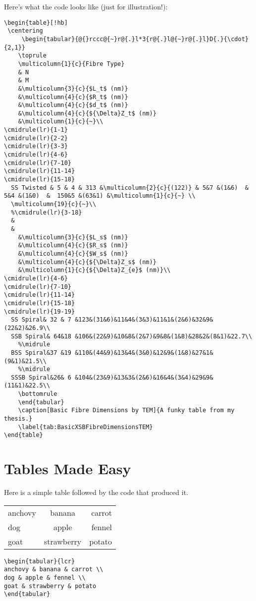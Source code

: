 \pagebreak
Here's what the code looks like (just for illustration!):
\begin{verbatim}
\begin{table}[!hb]
 \centering
	 \begin{tabular}{@{}rccc@{~}r@{.}l*3{r@{.}l@{~}r@{.}l}D{.}{\cdot}{2,1}}
	\toprule
	\multicolumn{1}{c}{Fibre Type}
	& N
	& M
	&\multicolumn{3}{c}{$L_t$ (nm)}
	&\multicolumn{4}{c}{$R_t$ (nm)}
	&\multicolumn{4}{c}{$d_t$ (nm)}
	&\multicolumn{4}{c}{${\Delta}Z_t$ (nm)}
	&\multicolumn{1}{c}{~}\\
\cmidrule(lr){1-1}
\cmidrule(lr){2-2}
\cmidrule(lr){3-3}
\cmidrule(lr){4-6}
\cmidrule(lr){7-10}
\cmidrule(lr){11-14}
\cmidrule(lr){15-18}
  SS Twisted & 5 & 4 & 313 &\multicolumn{2}{c}{(122)} & 5&7 &(1&6)  & 5&4 &(1&0)  &  150&5 &(63&1) &\multicolumn{1}{c}{~} \\
  \multicolumn{19}{c}{~}\\
  %\cmidrule(lr){3-18}
  &
  &
 	&\multicolumn{3}{c}{$L_s$ (nm)}
 	&\multicolumn{4}{c}{$R_s$ (nm)}
 	&\multicolumn{4}{c}{$W_s$ (nm)}
 	&\multicolumn{4}{c}{${\Delta}Z_s$ (nm)}
 	&\multicolumn{1}{c}{${\Delta}Z_{e}$ (nm)}\\
\cmidrule(lr){4-6}
\cmidrule(lr){7-10}
\cmidrule(lr){11-14}
\cmidrule(lr){15-18}
\cmidrule(lr){19-19}
  SS Spiral& 32 & 7 &123&(31&6)&11&4&(3&3)&11&1&(2&6)&32&9&(22&2)&26.9\\
  SSB Spiral& 64&18 &106&(22&9)&10&8&(2&7)&9&8&(1&8)&28&2&(8&1)&22.7\\
	%\midrule
  BSS Spiral&37 &19 &110&(44&9)&13&4&(3&0)&12&9&(1&8)&27&1&(9&1)&21.5\\
	%\midrule
  SSSB Spiral&26& 6 &104&(23&9)&13&3&(2&6)&16&4&(3&4)&29&9&(11&1)&22.5\\
	\bottomrule
	\end{tabular}	
	\caption[Basic Fibre Dimensions by TEM]{A funky table from my thesis.}
	\label{tab:BasicXSBFibreDimensionsTEM}
\end{table}
\end{verbatim}

\pagebreak

\section{Tables Made Easy}
Here is a simple table followed by the code that produced it.

\begin{center}
\begin{tabular}{lcr}
anchovy & banana & carrot \\
dog & apple & fennel \\
goat & strawberry & potato
\end{tabular}

\vspace*{2ex}

\begin{verbatim}
\begin{tabular}{lcr}
anchovy & banana & carrot \\
dog & apple & fennel \\
goat & strawberry & potato
\end{tabular}
\end{verbatim}
\end{center}

